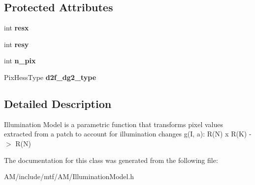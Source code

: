 \subsection*{Protected Attributes}
\begin{DoxyCompactItemize}
\item 
\hypertarget{classIlluminationModel_aff37102b88464457214ecf5675aa13e0}{int {\bfseries resx}}\label{classIlluminationModel_aff37102b88464457214ecf5675aa13e0}

\item 
\hypertarget{classIlluminationModel_a769764d8cb182650f4b91db9c7c83e9d}{int {\bfseries resy}}\label{classIlluminationModel_a769764d8cb182650f4b91db9c7c83e9d}

\item 
\hypertarget{classIlluminationModel_ae9b8983f2e6a518492c6b254a35884fa}{int {\bfseries n\-\_\-pix}}\label{classIlluminationModel_ae9b8983f2e6a518492c6b254a35884fa}

\item 
\hypertarget{classIlluminationModel_ae6a5f2a2373262dbcd413aedf4ed3701}{Pix\-Hess\-Type {\bfseries d2f\-\_\-dg2\-\_\-type}}\label{classIlluminationModel_ae6a5f2a2373262dbcd413aedf4ed3701}

\end{DoxyCompactItemize}


\subsection{Detailed Description}
Illumination Model is a parametric function that transforms pixel values extracted from a patch to account for illumination changes g(\-I, a)\-: R(\-N) x R(\-K) -\/$>$ R(\-N) 

The documentation for this class was generated from the following file\-:\begin{DoxyCompactItemize}
\item 
A\-M/include/mtf/\-A\-M/Illumination\-Model.\-h\end{DoxyCompactItemize}
